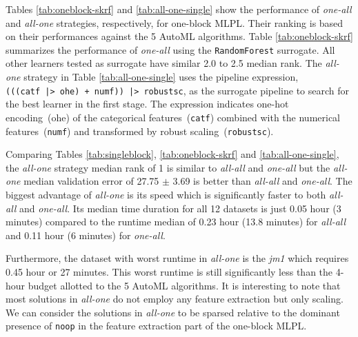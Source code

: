 \documentclass{juliacon}
\begin{document}









\vskip 6pt

Tables \ref{tab:oneblock-skrf} and \ref{tab:all-one-single} show the
performance of \emph{one-all} and \emph{all-one} strategies, 
respectively, for one-block MLPL. Their ranking is based on their performances against the 5 AutoML algorithms.
Table \ref{tab:oneblock-skrf} summarizes the performance of \emph{one-all}
using the \texttt{RandomForest} surrogate.
All other learners tested as surrogate have similar 2.0 to
2.5 median rank. The \emph{all-one} strategy in Table \ref{tab:all-one-single}
uses the pipeline expression,\texttt{(((catf~|>~ohe)~+~numf))~|>~robustsc},
as the surrogate pipeline to
search for the best learner in the first stage.  The expression indicates
one-hot encoding~(ohe) of the categorical features~(\texttt{catf}) combined
with the numerical features~(\texttt{numf}) and transformed by robust scaling~(\texttt{robustsc}).

\vskip 6pt

Comparing Tables \ref{tab:singleblock}, \ref{tab:oneblock-skrf} and \ref{tab:all-one-single}, 
the \emph{all-one} strategy median rank of 1 is
similar to \emph{all-all} and \emph{one-all} but the \emph{all-one}
median validation error of 27.75 $\pm$ 3.69 is better than \emph{all-all} and \emph{one-all}.
The biggest advantage of \emph{all-one}
is its speed which is significantly faster to both \emph{all-all} and \emph{one-all}.
Its median time duration for all 12 datasets is just 0.05
hour (3 minutes) compared to the runtime median of 0.23 hour (13.8 minutes)
for \emph{all-all} and 0.11 hour (6 minutes) for \emph{one-all}. 

\vskip 6pt

Furthermore, the dataset with worst runtime in \emph{all-one} is the
\emph{jm1} which requires 0.45 hour or 27 minutes.  This worst
runtime is still significantly less than the 4-hour budget allotted to the 5
AutoML algorithms. It is interesting to note that most solutions in
\emph{all-one} do not employ any feature extraction but only scaling. We
can consider the solutions in \emph{all-one} to be sparsed relative to
the dominant presence of \texttt{noop} in the feature extraction part
of the one-block MLPL.

\vskip 6pt
\end{document}
